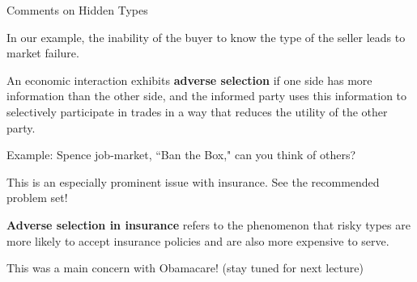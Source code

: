 \documentclass[aspectratio=169]{beamer}
\newenvironment{wideitemize}{\itemize\addtolength{\itemsep}{10pt}}{\enditemize}
\begin{document}
\begin{frame}{Comments on Hidden Types}
\begin{wideitemize}
    \item In our example, the inability of the buyer to know the type of the seller leads to market failure.
    \begin{definition}
    An economic interaction exhibits \textbf{adverse selection} if one side has more information than the other side, and the informed party uses this information to selectively participate in trades in a way that reduces the utility of the other party.
    \end{definition}
    \item Example: Spence job-market, ``Ban the Box," can you think of others?
    \item This is an especially prominent issue with insurance. See the recommended problem set!
    \begin{definition}
    \textbf{Adverse selection in insurance} refers to the phenomenon that risky types are more likely to accept insurance policies and are also more expensive to serve.
    \end{definition}
    \item This was a main concern with Obamacare! (stay tuned for next lecture)
\end{wideitemize}

    
\end{frame}
\end{document}

